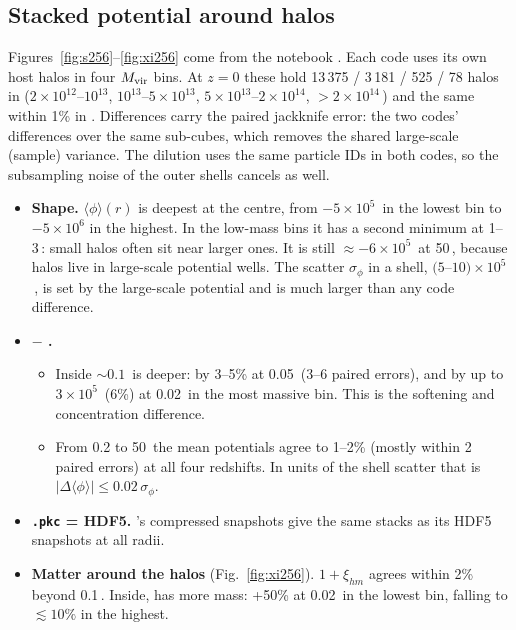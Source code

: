 \subsection{Stacked potential around halos}

Figures~\ref{fig:s256}--\ref{fig:xi256} come from the notebook . Each code uses its own
host halos in four $M_{\rm vir}$ bins. At $z=0$ these hold 13\,375 / 3\,181 / 525 / 78 halos in \gad{}
($2\times10^{12}$--$10^{13}$, $10^{13}$--$5\times10^{13}$, $5\times10^{13}$--$2\times10^{14}$, $>2\times10^{14}$\,\Msunh)
and the same within 1\% in \pkd{}. Differences carry the paired jackknife error: the two codes' differences
over the same sub-cubes, which removes the shared large-scale (sample) variance. The dilution uses the same particle
IDs in both codes, so the subsampling noise of the outer shells cancels as well.

\begin{itemize}
\item \textbf{Shape.} $\langle\phi\rangle(r)$ is deepest at the centre, from $-5\times10^{5}$\,\kms{} in the lowest
bin to $-5\times10^6$ in the highest. In the low-mass bins it has a second minimum at 1--3\,\Mpch: small halos
often sit near larger ones. It is still $\approx -6\times10^5$\,\kms{} at 50\,\Mpch, because halos live in
large-scale potential wells. The scatter $\sigma_\phi$ in a shell, $(5$--$10)\times10^5$\,\kms, is set by the
large-scale potential and is much larger than any code difference.
\item \textbf{\pkd{} $-$ \gad{}.}
  \begin{itemize}
  \item Inside $\sim0.1$\,\Mpch{} \pkd{} is deeper: by 3--5\% at 0.05\,\Mpch{} (3--6 paired errors), and by up to
  $3\times10^5$\,\kms{} (6\%) at 0.02\,\Mpch{} in the most massive bin. This is the softening and concentration
  difference.
  \item From 0.2 to 50\,\Mpch{} the mean potentials agree to 1--2\% (mostly within 2 paired errors) at all four
  redshifts. In units of the shell scatter that is $|\Delta\langle\phi\rangle| \le 0.02\,\sigma_\phi$.
  \end{itemize}
\item \textbf{\texttt{.pkc} = HDF5.} \pkd{}'s compressed snapshots give the same stacks as its HDF5 snapshots at all
radii.
\item \textbf{Matter around the halos} (Fig.~\ref{fig:xi256}). $1+\xi_{hm}$ agrees within 2\% beyond 0.1\,\Mpch.
Inside, \pkd{} has more mass: +50\% at 0.02\,\Mpch{} in the lowest bin, falling to $\lesssim 10\%$ in the
highest.
\end{itemize}

